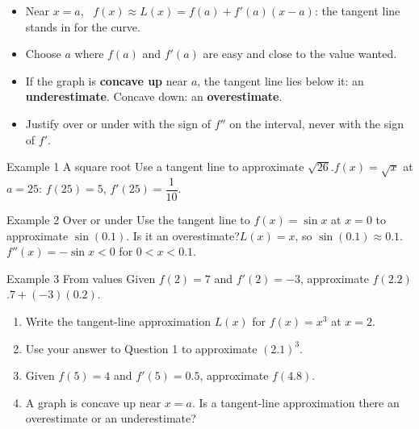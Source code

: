 \documentclass[11pt]{article}
\begin{document}

\begin{ideabox}
\begin{itemize}[leftmargin=*,itemsep=2pt,topsep=2pt]
  \item Near $x=a$, \ $f(x)\approx L(x)=f(a)+f'(a)(x-a)$: the tangent line stands in for the curve.
  \item Choose $a$ where $f(a)$ and $f'(a)$ are easy and close to the value wanted.
  \item If the graph is \textbf{concave up} near $a$, the tangent line lies below it: an \textbf{underestimate}. Concave down: an \textbf{overestimate}.
  \item Justify over or under with the sign of $f''$ on the interval, never with the sign of $f'$.
\end{itemize}
\end{ideabox}

\begin{example}{Example 1 \textperiodcentered{} A square root}
Use a tangent line to approximate $\sqrt{26}$.\soln $f(x)=\sqrt x$ at $a=25$: $f(25)=5$, $f'(25)=\dfrac{1}{10}$.
\end{example}

\begin{example}{Example 2 \textperiodcentered{} Over or under}
Use the tangent line to $f(x)=\sin x$ at $x=0$ to approximate $\sin(0.1)$. Is it an overestimate?\soln $L(x)=x$, so $\sin(0.1)\approx0.1$. $f''(x)=-\sin x<0$ for $0<x<0.1$.
\end{example}

\begin{example}{Example 3 \textperiodcentered{} From values}
Given $f(2)=7$ and $f'(2)=-3$, approximate $f(2.2)$.\soln $7+(-3)(0.2)$.
\end{example}

\newpage
{}

\begin{enumerate}[leftmargin=*,itemsep=2pt]
  \item Write the tangent-line approximation $L(x)$ for $f(x)=x^3$ at $x=2$.\work{2.3cm}
  \item Use your answer to Question 1 to approximate $(2.1)^3$.\work{2.3cm}
  \item Given $f(5)=4$ and $f'(5)=0.5$, approximate $f(4.8)$.\work{2.3cm}
  \item A graph is concave up near $x=a$. Is a tangent-line approximation there an overestimate or an underestimate?\work{2.3cm}
\end{enumerate}
\end{document}
